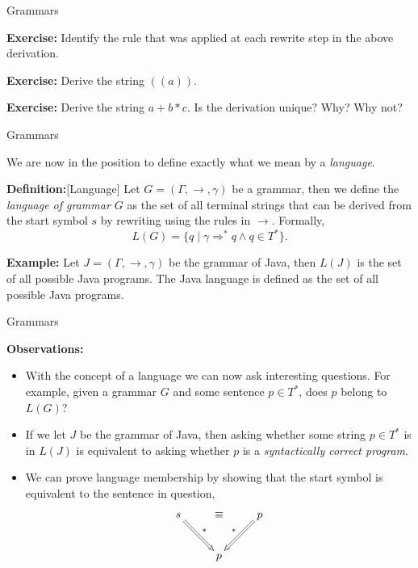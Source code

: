 \documentclass{beamer}
\begin{document}
\begin{frame}[fragile]{Grammars}

{\bf Exercise:} Identify the rule that was applied at each rewrite step in the above derivation.

{\bf Exercise:} Derive the string $((a))$.

{\bf Exercise:} Derive the string $a + b * c$.  Is the derivation unique?  Why? Why not?

\end{frame}

\begin{frame}[fragile]{Grammars}

\small
We are now in the position to define exactly what we mean by a {\em language}.

\vspace{.2in}
{\bf Definition:}[Language] Let $G = (\Gamma,\rightarrow,\gamma)$ be a grammar, then we define the {\em language of
grammar $G$} as the set of all terminal strings that can be derived from the start symbol $s$ by rewriting
using the rules in $\rightarrow$.  Formally,
\[
L(G) = \{ q \mid \gamma \Rightarrow^* q \wedge q\in T^*\}.
\]

\vspace{.3in}
{\bf Example:} Let $J = (\Gamma,\rightarrow,\gamma)$ be the grammar of Java, then $L(J)$ is the set of all possible Java 
programs.  The Java language is defined as the set of all possible Java programs.
\end{frame}


\begin{frame}[fragile]{Grammars}

\small
{\bf Observations:}  
\begin{itemize}
\item With the concept of a language we can now ask interesting questions.  For example,
given a grammar $G$ and some sentence $p\in T^*$, does $p$ belong to $L(G)$?
\item If we let $J$ be the grammar of Java, then asking whether some string $p\in T^*$ is in $L(J)$
is equivalent to asking whether $p$ is a {\em syntactically correct program}.
\item We can prove language membership by showing that the start symbol is equivalent to the
sentence in question, 
{\scriptsize
\[
\xymatrix{
s \ar@{=>}[rd]^{*} &\equiv &p\ar@{=>}[ld]_{*}  \\
&p&
}
\]
}

\end{itemize}

\end{frame}
\end{document}
